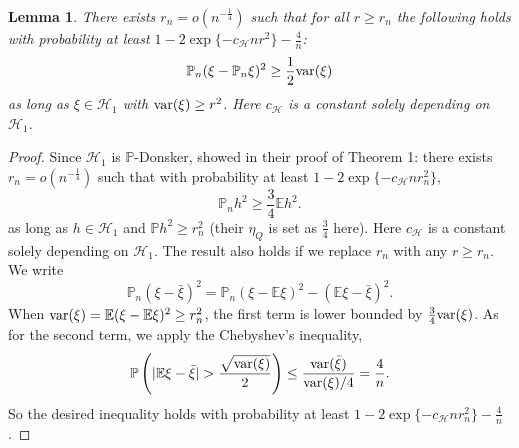 \documentclass[12pt]{article}
\newtheorem{lemma}{Lemma}
\newcommand{\E}{\mathbb{E}}
\newcommand{\prob}{\mathbb{P}}
\newcommand{\var}{\textnormal{var}}
\begin{document}
\begin{lemma}
	\label{lem:G_bound}
	There exists $r_n = o(n^{-\frac{1}{4}})$ such that for all $r \ge r_n$ the following holds with probability at least 
	$1 - 2\exp\{-c_\mathcal{H} n r^2\} - \frac{4}{n}$:
	\begin{equation*}
		\prob_n (\xi - \prob_n \xi)^2 \ge 
		\frac{1}{2} \var(\xi)
	\end{equation*}
	as long as $\xi \in \mathcal{H}_1$ with $\var(\xi) \ge r^2$. Here $c_\mathcal{H}$ is a constant solely depending on $\mathcal{H}_1$.
\end{lemma}
\begin{proof}
	Since $\mathcal{H}_1$ is $\prob$-Donsker, \citet{hirshberg2017augmented} showed in their proof of Theorem 1: there exists $r_n = o(n^{-\frac{1}{4}})$ such that with probability at least $1 - 2 \exp\{-c_\mathcal{H} n r_n^2\}$, 
	\begin{equation*}
		\prob_n h^2 \ge \frac{3}{4} \E h^2
		.\end{equation*}
	as long as $h \in \mathcal{H}_1$ and $\prob h^2 \ge r_n^2$ (their $\eta_Q$ is set as $\frac{3}{4}$ here). Here $c_\mathcal{H}$ is a constant solely depending on $\mathcal{H}_1$. The result also holds if we replace $r_n$ with any $r \ge r_n$.
	We write 
	\begin{equation*}
		\prob_n (\xi - \bar{\xi})^2
		=
		\prob_n (\xi - \E \xi)^2 - (\E \xi - \bar{\xi})^2
		.\end{equation*}
	When $\var(\xi) = \E (\xi - \E\xi)^2 \ge r_n^2$, the first term is lower bounded by $\frac{3}{4}\var(\xi)$. As for the second term, we apply the Chebyshev's inequality,
	\begin{equation*}
		\prob\left( |\E \xi - \bar{\xi}| > \frac{\sqrt{\var(\xi)}}{2} \right)
		\le \frac{\var(\bar{\xi})}{\var(\xi) / 4} = \frac{4}{n}
		.\end{equation*}
	So the desired inequality holds with probability at least $1 - 2\exp\{-c_\mathcal{H} n r_n^2\} - \frac{4}{n}$.
	
\end{proof}
\end{document}
